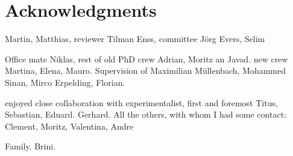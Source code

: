 
\bigskip

\begingroup
\let\clearpage\relax
\let\cleardoublepage\relax
\let\cleardoublepage\relax
\chapter*{Acknowledgments}
Martin, Matthias, reviewer Tilman Enss, committee Jörg Evers, Selim

Office mate Niklas, rest of old PhD crew Adrian, Moritz an Javad. new crew Martina, Elena, Mauro. Supervision of Maximilian Müllenbach, Mohammed Sinan, Mirco Erpelding, Florian.

enjoyed close collaboration with experimentalist, first and foremost Titus, Sebastian, Eduard. Gerhard. All the others, with whom I had some contact: Clement, Moritz, Valentina, Andre

Family. Brini.
\endgroup
